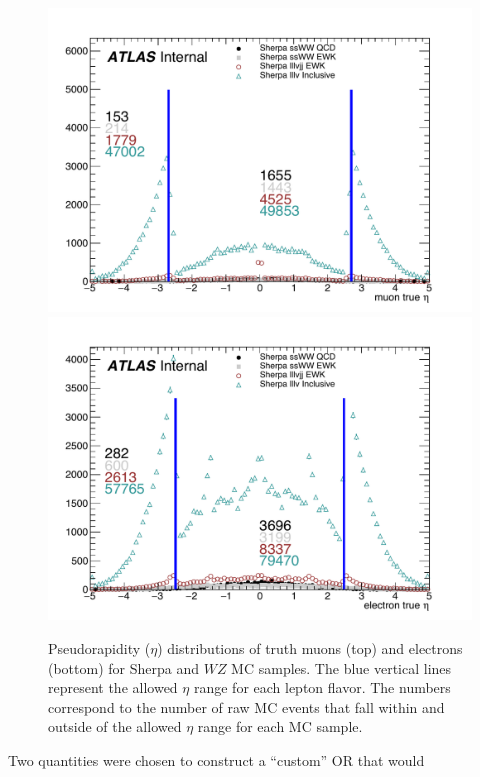 \begin{figure}[htbp]
  \centering
  \includegraphics[width=.48\textwidth]{figs/ssww_13tev/custom_or/ExtraMuonEta_counted}
  \includegraphics[width=.48\textwidth]{figs/ssww_13tev/custom_or/ExtraElecEta_counted}
  \caption{Pseudorapidity ($\eta$) distributions of truth muons (top) and electrons (bottom) for Sherpa \ssww and $WZ$ MC samples.  The blue vertical lines represent the allowed $\eta$ range for each lepton flavor.  The numbers correspond to the number of raw MC events that fall within and outside of the allowed $\eta$ range for each MC sample.}
  \label{fig:ssww13tev_wzveto_truthlepeta}
\end{figure}

Two quantities were chosen to construct a ``custom'' OR that would 

